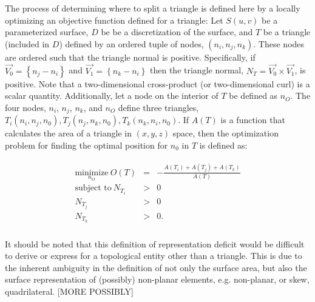 The process of determining where to split a triangle is defined here by
a locally optimizing an objective function defined for a triangle: Let
$S(u,v)$ be a parameterized surface, $D$ be be a discretization of the
surface, and $T$ be a triangle (included in $D$) defined by an ordered
tuple of nodes, $\left(n_i, n_j, n_k\right)$. These nodes are ordered
such that the triangle normal is positive. Specifically, if $\vec{V_0} =
\left\{n_j - n_i \right\}$ and $\vec{V_1} = \left\{n_k - n_i\right\}$
then the triangle normal, $N_T = \vec{V_0} \times \vec{V_1}$, is
positive. Note that a two-dimensional cross-product (or two-dimensional
curl) is a scalar quantity. Additionally, let a node on the interior of
$T$ be defined as $n_O$. The four nodes, $n_i$, $n_j$, $n_k$, and $n_O$
define three triangles, $T_i\left(n_i,n_j,n_0\right), T_j\left(n_j, n_k,
n_0\right), T_k\left(n_k, n_i, n_0\right)$. If $A(T)$ is a function
that calculates the area of a triangle in $\left(x,y,z\right)$ space,
then the optimization problem for finding the optimal position for $n_0$
in $T$ is defined as:

\begin{eqnarray*}
\begin{array}{rcl}
\underset{n_O}{\text{minimize}} \ O(T) & = & - \frac{A\left(T_i\right) + A\left(T_j\right) + A\left(T_k\right) }{ A\left(T\right) }\\
\text{subject to} \ N_{T_i} & > & 0 \\
N_{T_j} & > & 0 \\ 
N_{T_k} & > & 0. \\
\end{array}
\end{eqnarray*}

It should be noted that this definition of representation deficit would
be difficult to derive or express for a topological entity other than a
triangle. This is due to the inherent ambiguity in the definition of not
only the surface area, but also the surface representation of (possibly)
non-planar elements, e.g. non-planar, or skew, quadrilateral. [MORE
POSSIBLY]
